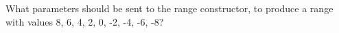  \label{sssec:ex1_10}

What parameters should be sent to the range constructor, to produce a
range with values 8, 6, 4, 2, 0, -2, -4, -6, -8?

